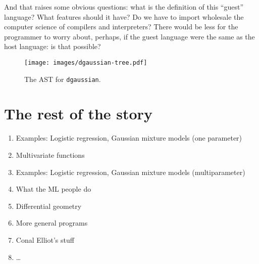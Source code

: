 \documentclass[11pt, a4paper]{article}
\newcommand{\cd}[1]{\texttt{#1}}
\begin{document}
And that raises some obvious questions: what is the definition of this
``guest'' language? What features should it have? Do we have to import
wholesale the computer science of compilers and interpreters?  There
would be less for the programmer to worry about, perhaps, if the guest
language were the same as the host language: is that possible?
\begin{figure}[ht]
  \caption{The AST for \cd{dgaussian}.\label{fig:dgaussian-tree}}
  \centering
  \texttt{[image: images/dgaussian-tree.pdf]}
\end{figure}




\section{The rest of the story}

\begin{enumerate}
\item Examples: Logistic regression, Gaussian mixture models (one parameter)
\item Multivariate functions
\item Examples: Logistic regression, Gaussian mixture models (multiparameter)
\item What the ML people do 
\item Differential geometry
\item More general programs
\item Conal Elliot's stuff
\item \dots
\end{enumerate}
\end{document}
